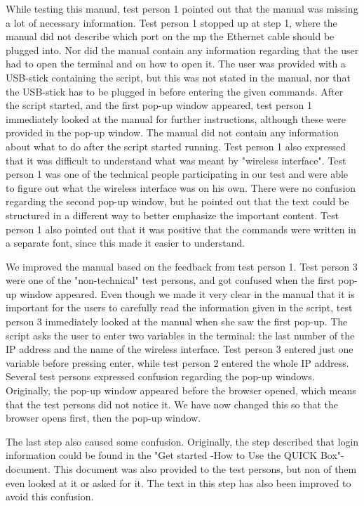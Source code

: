 While testing this manual, test person 1 pointed out that the manual was missing a lot of necessary information. Test person 1 stopped up at step 1, where the manual did not describe which port on the \gls{mp} the Ethernet cable should be plugged into. Nor did the manual contain any information regarding that the user had to open the terminal and on how to open it. The user was provided with a USB-stick containing the script, but this was not stated in the manual, nor that the USB-stick has to be plugged in before entering the given commands. After the script started, and the first pop-up window appeared, test person 1 immediately looked at the manual for further instructions, although these were provided in the pop-up window. The manual did not contain any information about what to do after the script started running. Test person 1 also expressed that it was difficult to understand what was meant by "wireless interface". Test person 1 was one of the technical people participating in our test and were able to figure out what the wireless interface was on his own. There were no confusion regarding the second pop-up window, but he pointed out that the text could be structured in a different way to better emphasize the important content.
Test person 1 also pointed out that it was positive that the commands were written in a separate font, since this made it easier to understand. 

We improved the manual based on the feedback from test person 1. Test person 3 were one of the "non-technical" test persons, and got confused when the first pop-up window appeared. Even though we made it very clear in the manual that it is important for the users to carefully read the information given in the script, test person 3 immediately looked at the manual when she saw the first pop-up. The script asks the user to enter two variables in the terminal: the last number of the IP address and the name of the wireless interface. Test person 3 entered just one variable before pressing enter, while test person 2 entered the whole IP address. 
Several test persons expressed confusion regarding the pop-up windows. Originally, the pop-up window appeared before the browser opened, which means that the test persons did not notice it. We have now changed this so that the browser opens first, then the pop-up window. 

The last step also caused some confusion. Originally, the step described that login information could be found in the "Get started -How to Use the QUICK Box"-document. This document was also provided to the test persons, but non of them even looked at it or asked for it. The text in this step has also been improved to avoid this confusion.

